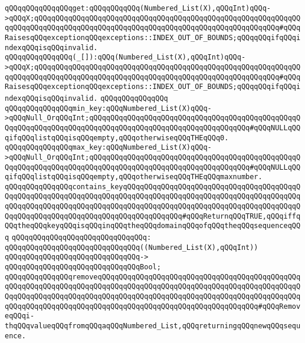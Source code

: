 \verb|qQQqqQQqqQQqqQQqget:qQQqqQQqqQQq(Numbered_List(X),qQQqInt)qQQq->qQQqX;qQQqqQQqqQQqqQQqqQQqqQQqqQQqqQQqqQQqqQQqqQQqqQQqqQQqqQQqqQQqqQQqqQQqqQQqqQQqqQQqqQQqqQQqqQQqqQQqqQQqqQQqqQQqqQQqqQQqqQQqqQQqqQQq#qQQqRaisesqQQqexceptionqQQqexceptions::INDEX_OUT_OF_BOUNDS;qQQqqQQqifqQQqindexqQQqisqQQqinvalid.|\newline
\verb|qQQqqQQqqQQqqQQq(_[]):qQQq(Numbered_List(X),qQQqInt)qQQq->qQQqX;qQQqqQQqqQQqqQQqqQQqqQQqqQQqqQQqqQQqqQQqqQQqqQQqqQQqqQQqqQQqqQQqqQQqqQQqqQQqqQQqqQQqqQQqqQQqqQQqqQQqqQQqqQQqqQQqqQQqqQQqqQQqqQQq#qQQqRaisesqQQqexceptionqQQqexceptions::INDEX_OUT_OF_BOUNDS;qQQqqQQqifqQQqindexqQQqisqQQqinvalid.|\newline
\verb|qQQqqQQqqQQqqQQq|\newline
\newline
\verb|qQQqqQQqqQQqqQQqmin_key:qQQqNumbered_List(X)qQQq->qQQqNull_OrqQQqInt;qQQqqQQqqQQqqQQqqQQqqQQqqQQqqQQqqQQqqQQqqQQqqQQqqQQqqQQqqQQqqQQqqQQqqQQqqQQqqQQqqQQqqQQqqQQqqQQqqQQqqQQqqQQq#qQQqNULLqQQqifqQQqlistqQQqisqQQqempty,qQQqotherwiseqQQqTHEqQQq0.|\newline
\verb|qQQqqQQqqQQqqQQqmax_key:qQQqNumbered_List(X)qQQq->qQQqNull_OrqQQqInt;qQQqqQQqqQQqqQQqqQQqqQQqqQQqqQQqqQQqqQQqqQQqqQQqqQQqqQQqqQQqqQQqqQQqqQQqqQQqqQQqqQQqqQQqqQQqqQQqqQQqqQQqqQQq#qQQqNULLqQQqifqQQqlistqQQqisqQQqempty,qQQqotherwiseqQQqTHEqQQqmaxnumber.|\newline
\newline
\verb|qQQqqQQqqQQqqQQqcontains_keyqQQqqQQqqQQqqQQqqQQqqQQqqQQqqQQqqQQqqQQqqQQqqQQqqQQqqQQqqQQqqQQqqQQqqQQqqQQqqQQqqQQqqQQqqQQqqQQqqQQqqQQqqQQqqQQqqQQqqQQqqQQqqQQqqQQqqQQqqQQqqQQqqQQqqQQqqQQqqQQqqQQqqQQqqQQqqQQqqQQqqQQqqQQqqQQqqQQqqQQqqQQqqQQqqQQqqQQqqQQqqQQq#qQQqReturnqQQqTRUE,qQQqiffqQQqtheqQQqkeyqQQqisqQQqinqQQqtheqQQqdomainqQQqofqQQqtheqQQqsequenceqQQq|\newline
\verb|qQQqqQQqqQQqqQQqqQQqqQQqqQQqqQQq:|\newline
\verb|qQQqqQQqqQQqqQQqqQQqqQQqqQQqqQQq((Numbered_List(X),qQQqInt))|\newline
\verb|qQQqqQQqqQQqqQQqqQQqqQQqqQQqqQQq->|\newline
\verb|qQQqqQQqqQQqqQQqqQQqqQQqqQQqqQQqBool;|\newline
\newline
\verb|qQQqqQQqqQQqqQQqremoveqQQqqQQqqQQqqQQqqQQqqQQqqQQqqQQqqQQqqQQqqQQqqQQqqQQqqQQqqQQqqQQqqQQqqQQqqQQqqQQqqQQqqQQqqQQqqQQqqQQqqQQqqQQqqQQqqQQqqQQqqQQqqQQqqQQqqQQqqQQqqQQqqQQqqQQqqQQqqQQqqQQqqQQqqQQqqQQqqQQqqQQqqQQqqQQqqQQqqQQqqQQqqQQqqQQqqQQqqQQqqQQqqQQqqQQqqQQqqQQqqQQqqQQq#qQQqRemoveqQQqi-thqQQqvalueqQQqfromqQQqaqQQqNumbered_List,qQQqreturningqQQqnewqQQqsequence.|\newline
